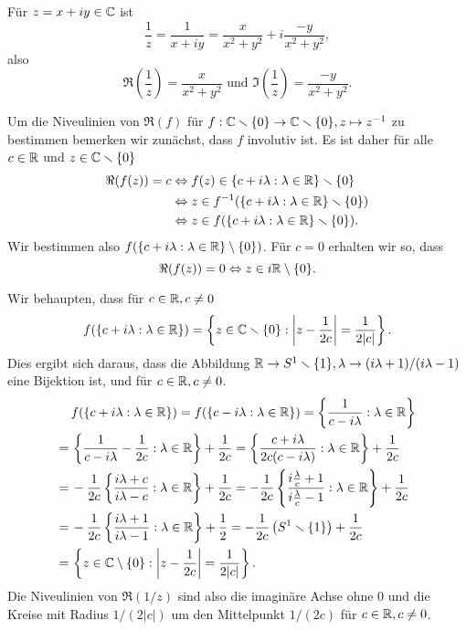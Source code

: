 \documentclass[a4paper,10pt]{article}
\begin{document}
Für $z = x+iy \in \mathbb{C}$ ist
\[
 \frac{1}{z} = \frac{1}{x+iy} = \frac{x}{x^2+y^2} + i\frac{-y}{x^2+y^2},
\]
also
\[
 \Re\left(\frac{1}{z}\right) = \frac{x}{x^2+y^2} \text{ und }
 \Im\left(\frac{1}{z}\right) = \frac{-y}{x^2+y^2}.
\]

Um die Niveulinien von $\Re(f)$ für $f : \mathbb{C} \smallsetminus \{0\} \to \mathbb{C} \smallsetminus \{0\}, z \mapsto z^{-1}$ zu bestimmen bemerken wir zunächst, dass $f$ involutiv ist. Es ist daher für alle $c \in \mathbb{R}$ und $z \in \mathbb{C} \smallsetminus \{0\}$
\begin{align*}
 \Re(f(z)) = c
 &\Leftrightarrow f(z) \in \{c + i\lambda : \lambda \in \mathbb{R}\} \smallsetminus \{0\} \\
 &\Leftrightarrow z \in f^{-1}(\{c + i\lambda : \lambda \in \mathbb{R}\} \smallsetminus \{0\}) \\
 &\Leftrightarrow z \in f(\{c + i\lambda : \lambda \in \mathbb{R}\} \smallsetminus \{0\}).
\end{align*}
Wir bestimmen also $f(\{c+i\lambda : \lambda \in \mathbb{R}\} \setminus \{0\})$. Für $c = 0$ erhalten wir so, dass
\[
 \Re(f(z)) = 0 \Leftrightarrow z \in i\mathbb{R} \setminus\{0\}.
\]

Wir behaupten, dass für $c \in \mathbb{R}, c \neq 0$
\[
 f(\{c + i\lambda : \lambda \in \mathbb{R}\})
 = \left\{z \in \mathbb{C} \smallsetminus \{0\} : \left|z-\frac{1}{2c}\right| = \frac{1}{2|c|} \right\}.
\]
Dies ergibt sich daraus, dass die Abbildung $\mathbb{R} \to S^1 \smallsetminus\{1\}, \lambda \to (i\lambda+1)/(i\lambda-1)$ eine Bijektion ist, und für $c \in \mathbb{R}, c \neq 0$.
\begin{align*}
 &\,f(\{c+i\lambda : \lambda \in \mathbb{R}\})
 = f(\{c-i\lambda : \lambda \in \mathbb{R}\})
 = \left\{\frac{1}{c-i\lambda} : \lambda \in \mathbb{R}\right\} \\
 =&\, \left\{\frac{1}{c-i\lambda} - \frac{1}{2c} : \lambda \in \mathbb{R}\right\} + \frac{1}{2c}
 = \left\{\frac{c+i\lambda}{2c(c-i\lambda)} : \lambda \in \mathbb{R}\right\} + \frac{1}{2c} \\
 =&\, -\frac{1}{2c} \left\{\frac{i\lambda+c}{i\lambda-c} : \lambda \in \mathbb{R}\right\} + \frac{1}{2c}
 = -\frac{1}{2c} \left\{\frac{i\frac{\lambda}{c}+1}{i\frac{\lambda}{c}-1} : \lambda \in \mathbb{R}\right\} + \frac{1}{2c} \\
 =&\, -\frac{1}{2c} \left\{\frac{i\lambda+1}{i\lambda-1} : \lambda \in \mathbb{R}\right\} + \frac{1}{2}
 = -\frac{1}{2c} \left(S^1 \smallsetminus\{1\}\right) + \frac{1}{2c} \\
 =&\, \left\{z \in \mathbb{C} \setminus\{0\} : \left|z-\frac{1}{2c}\right| = \frac{1}{2|c|}\right\}.
\end{align*}
Die Niveulinien von $\Re(1/z)$ sind also die imaginäre Achse ohne $0$ und die Kreise mit Radius $1/(2|c|)$ um den Mittelpunkt $1/(2c)$ für $c \in \mathbb{R}, c \neq 0$.
\end{document}

